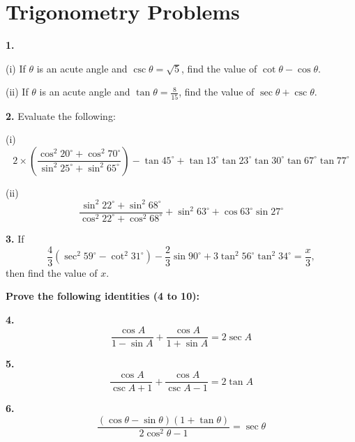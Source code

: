 \documentclass{article}
\begin{document}
	\section*{Trigonometry Problems}
	\begin{multicols}{2}
		
		\textbf{1.}
		
		(i) If $\theta$ is an acute angle and $\csc \theta = \sqrt{5}$, find the value of $\cot \theta - \cos \theta$.
		
		\vspace{0.5cm}
		
		(ii) If $\theta$ is an acute angle and $\tan \theta = \frac{8}{15}$, find the value of $\sec \theta + \csc \theta$.
		
		\vspace{1cm}
		
		\textbf{2.} Evaluate the following:
		
		(i)
		\[
		2 \times \left( \frac{\cos^2 20^\circ + \cos^2 70^\circ}{\sin^2 25^\circ + \sin^2 65^\circ} \right) - \tan 45^\circ + \tan 13^\circ \tan 23^\circ \tan 30^\circ \tan 67^\circ \tan 77^\circ
		\]
		
		\vspace{0.5cm}
		
		(ii)
		\[
		\frac{\sin^2 22^\circ + \sin^2 68^\circ}{\cos^2 22^\circ + \cos^2 68^\circ} + \sin^2 63^\circ + \cos 63^\circ \sin 27^\circ
		\]
		
		\vspace{1cm}
		
		\textbf{3.} If
		\[
		\frac{4}{3} (\sec^2 59^\circ - \cot^2 31^\circ) - \frac{2}{3} \sin 90^\circ + 3 \tan^2 56^\circ \tan^2 34^\circ = \frac{x}{3},
		\]
		then find the value of $x$.
		
		\vspace{1cm}
		
		\textbf{Prove the following identities (4 to 10):}
		
		\textbf{4.}
		\[
		\frac{\cos A}{1-\sin A} + \frac{\cos A}{1+\sin A} = 2\sec A
		\]
		
		\textbf{5.}
		\[
		\frac{\cos A}{\csc A + 1} + \frac{\cos A}{\csc A - 1} = 2\tan A
		\]
		
		\textbf{6.}
		\[
		\frac{(\cos \theta - \sin \theta)(1 + \tan \theta)}{2\cos^2 \theta - 1} = \sec \theta
		\]
		
	\end{multicols}
	
\end{document}
